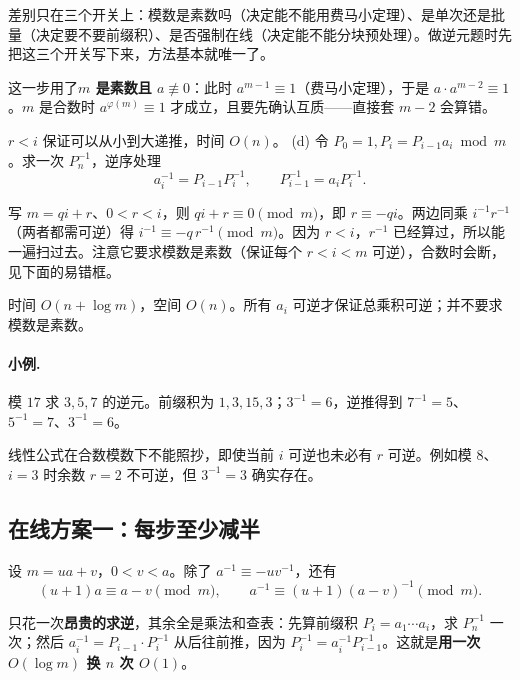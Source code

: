 \begin{tip}[为什么要分五类]
差别只在三个开关上：模数是素数吗（决定能不能用费马小定理）、是单次还是批量（决定要不要前缀积）、是否强制在线（决定能不能分块预处理）。做逆元题时先把这三个开关写下来，方法基本就唯一了。
\end{tip}

\begin{tip}
这一步用了\textbf{$m$ 是素数且 $a\not\equiv0$}：此时 $a^{m-1}\equiv1$（费马小定理），于是 $a\cdot a^{m-2}\equiv1$。$m$ 是合数时 $a^{\varphi(m)}\equiv1$ 才成立，且要先确认互质——直接套 $m-2$ 会算错。
\end{tip}

$r<i$ 保证可以从小到大递推，时间 $O(n)$。
(d) 令 $P_0=1,P_i=P_{i-1}a_i\bmod m$。求一次 $P_n^{-1}$，逆序处理
\[
 a_i^{-1}=P_{i-1}P_i^{-1},\qquad P_{i-1}^{-1}=a_iP_i^{-1}.
\]

\begin{tip}[线性递推逆元公式是怎么来的]
写 $m=qi+r$、$0<r<i$，则 $qi+r\equiv0\pmod m$，即 $r\equiv-qi$。两边同乘 $i^{-1}r^{-1}$（两者都需可逆）得 $i^{-1}\equiv-q\,r^{-1}\pmod m$。因为 $r<i$，$r^{-1}$ 已经算过，所以能一遍扫过去。注意它要求模数是素数（保证每个 $r<i<m$ 可逆），合数时会断，见下面的易错框。
\end{tip}

时间 $O(n+\log m)$，空间 $O(n)$。所有 $a_i$ 可逆才保证总乘积可逆；并不要求模数是素数。

\paragraph{小例.} 模 $17$ 求 $3,5,7$ 的逆元。前缀积为 $1,3,15,3$；$3^{-1}=6$，逆推得到 $7^{-1}=5$、$5^{-1}=7$、$3^{-1}=6$。

\begin{pitfall}
线性公式在合数模数下不能照抄，即使当前 $i$ 可逆也未必有 $r$ 可逆。例如模 $8$、$i=3$ 时余数 $r=2$ 不可逆，但 $3^{-1}=3$ 确实存在。
\end{pitfall}

\subsection{在线方案一：每步至少减半}
设 $m=ua+v$，$0<v<a$。除了 $a^{-1}\equiv-u v^{-1}$，还有
\[
 (u+1)a\equiv a-v\pmod m,
 \qquad a^{-1}\equiv(u+1)(a-v)^{-1}\pmod m.
\]

\begin{tip}[前缀积批量求逆元的想法]
只花一次\textbf{昂贵的求逆}，其余全是乘法和查表：先算前缀积 $P_i=a_1\cdots a_i$，求 $P_n^{-1}$ 一次；然后 $a_i^{-1}=P_{i-1}\cdot P_i^{-1}$ 从后往前推，因为 $P_i^{-1}=a_i^{-1}P_{i-1}^{-1}$。这就是\textbf{用一次 $O(\log m)$ 换 $n$ 次 $O(1)$}。
\end{tip}

